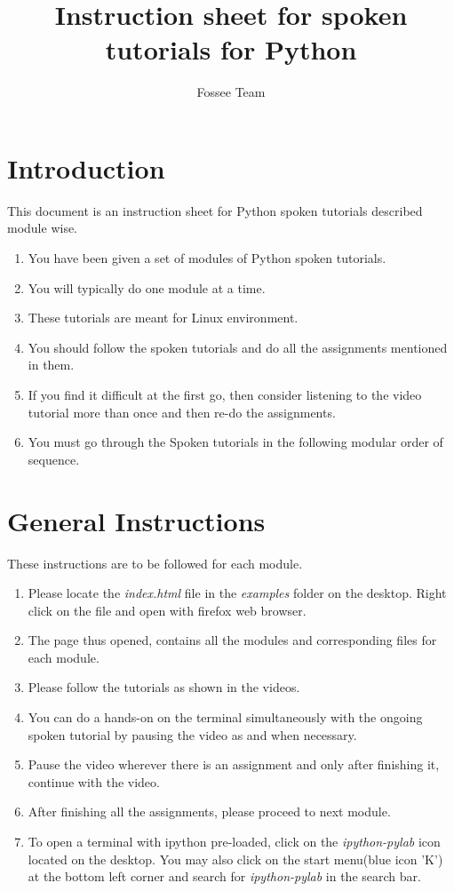 \documentclass[11pt,twocolumn]{article}
\begin{document}
\title{Instruction sheet for spoken tutorials for Python}
\author{Fossee Team}
\maketitle
\section*{Introduction }
{This document is an instruction sheet for Python spoken tutorials described module wise.}
\setlength{\columnsep}{15pt }
\begin{enumerate}
  \item You have been given a set of modules of Python spoken tutorials.
  \item You will typically do one module at a time.
  \item These tutorials are meant for Linux environment.
  \item You should follow the spoken tutorials and do all the assignments mentioned in them.
   \item If you find it difficult at the first go, then consider listening to the video tutorial more than once and then re-do the assignments.
   \item You must go through the Spoken tutorials in the following modular order of sequence. 
  

\end{enumerate}

\section*{General Instructions}
{These instructions are to be followed for each module.}
\setlength{\columnsep}{15pt }
\begin{enumerate}
	  
	
	\item Please locate the \emph{index.html} file in the \emph{examples} folder on the desktop. Right click on the file and open with firefox web browser.
     \item  The page thus opened, contains all the modules and corresponding files for each module.
  \item Please follow the tutorials as shown in the videos.
  \item You can do a hands-on on the terminal simultaneously with the ongoing spoken tutorial by pausing the video as and when necessary.
  \item Pause the video wherever there is an assignment and only after finishing it, continue with the video.
  \item After finishing all the assignments, please proceed to next module. 
\item To open a terminal with ipython pre-loaded, click on the \emph{ipython-pylab} icon located on the desktop. You may also click on the start menu(blue icon 'K') at the bottom left corner and search for \emph{ipython-pylab} in the search bar.


\end{enumerate}
\end{document}
